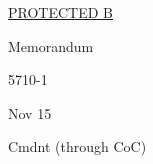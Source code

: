 \documentclass[12pt]{amsart} %
\begin{document}


\uline{PROTECTED B} %

\vspace{14pt}


Memorandum

\vspace{14pt}


5710-1 %

\vspace{14pt}


\hspace{0.375in} Nov 15

\vspace{14pt}


Cmdnt (through CoC) %

\vspace{14pt}


\end{document}
